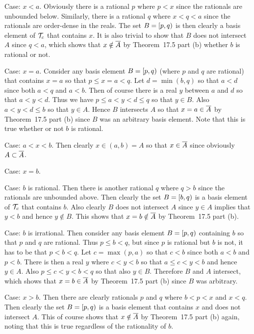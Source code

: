 {{    Case: $x < a$.
    Obviously there is a rational $p$ where $p < x$ since the rationals are unbounded below.
    Similarly, there is a rational $q$ where $x < q < a$ since the rationals are order-dense in the reals.
    The set $B = [p,q)$ is then clearly a basis element of $\mathcal{T}_c$ that contains $x$.
    It is also trivial to show that $B$ does not intersect $A$ since $q < a$, which shows that $x \notin \overline{A}$ by Theorem~17.5 part (b) whether $b$ is rational or not.

    Case: $x = a$.
    Consider any basis element $B = [p,q)$ (where $p$ and $q$ are rational) that contains $x = a$ so that $p \leq x = a < q$.
    Let $d = \min(b,q)$ so that $a < d$ since both $a < q$ and $a < b$.
    Then of course there is a real $y$ between $a$ and $d$ so that $a < y < d$.
    Thus we have $p \leq a < y < d \leq q$ so that $y \in B$.
    Also $a < y < d \leq b$ so that $y \in A$.
    Hence $B$ intersects $A$ so that $x = a \in \overline{A}$ by Theorem~17.5 part (b) since $B$ was an arbitrary basis element.
    Note that this is true whether or not $b$ is rational.

    Case: $a < x < b$.
    Then clearly $x \in (a,b) = A$ so that $x \in \overline{A}$ since obviously $A \subset \overline{A}$.

    Case: $x = b$.
    \begin{indpar}
      Case: $b$ is rational.
      Then there is another rational $q$ where $q > b$ since the rationals are unbounded above.
      Then clearly the set $B = [b, q)$ is a basis element of $\mathcal{T}_c$ that contains $b$.
      Also clearly $B$ does not intersect $A$ since $y \in A$ implies that $y < b$ and hence $y \notin B$.
      This shows that $x = b \notin \overline{A}$ by Theorem~17.5 part (b).

      Case: $b$ is irrational.
      Then consider any basis element $B = [p,q)$ containing $b$ so that $p$ and $q$ are rational.
      Thus $p \leq b < q$, but since $p$ is rational but $b$ is not, it has to be that $p < b < q$.
      Let $c = \max(p,a)$ so that $c < b$ since both $a < b$ and $p < b$.
      There is then a real $y$ where $c < y < b$ so that $a \leq c < y < b$ and hence $y \in A$.
      Also $p \leq c < y < b < q$ so that also $y \in B$.
      Therefore $B$ and $A$ intersect, which shows that $x = b \in \overline{A}$ by Theorem~17.5 part (b) since $B$ was arbitrary.
    \end{indpar}

    Case: $x > b$.
    Then there are clearly rationals $p$ and $q$ where $b < p < x$ and $x < q$.
    Then clearly the set $B = [p,q)$ is a basis element that contains $x$ and does not intersect $A$.
    This of course shows that $x \notin \overline{A}$ by Theorem~17.5 part (b) again, noting that this is true regardless of the rationality of $b$.

}}
